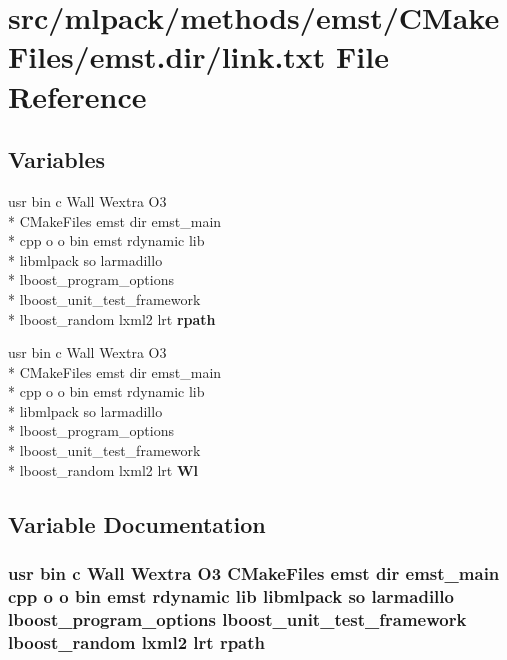 \section{src/mlpack/methods/emst/\-C\-Make\-Files/emst.dir/link.txt File Reference}
\label{methods_2emst_2CMakeFiles_2emst_8dir_2link_8txt}
\subsection*{Variables}
\begin{DoxyCompactItemize}
\item 
usr bin c Wall Wextra O3 \\*
C\-Make\-Files emst dir emst\-\_\-main \\*
cpp o o bin emst rdynamic lib \\*
libmlpack so larmadillo \\*
lboost\-\_\-program\-\_\-options \\*
lboost\-\_\-unit\-\_\-test\-\_\-framework \\*
lboost\-\_\-random lxml2 lrt {\bf rpath}
\item 
usr bin c Wall Wextra O3 \\*
C\-Make\-Files emst dir emst\-\_\-main \\*
cpp o o bin emst rdynamic lib \\*
libmlpack so larmadillo \\*
lboost\-\_\-program\-\_\-options \\*
lboost\-\_\-unit\-\_\-test\-\_\-framework \\*
lboost\-\_\-random lxml2 lrt {\bf Wl}
\end{DoxyCompactItemize}


\subsection{Variable Documentation}
\subsubsection[{rpath}]{\setlength{\rightskip}{0pt plus 5cm}usr bin c Wall Wextra O3 C\-Make\-Files emst dir emst\-\_\-main cpp o o bin emst rdynamic lib libmlpack so larmadillo lboost\-\_\-program\-\_\-options lboost\-\_\-unit\-\_\-test\-\_\-framework lboost\-\_\-random lxml2 lrt rpath}\label{methods_2emst_2CMakeFiles_2emst_8dir_2link_8txt_a8d22a1efe1c908ec46049a661ec7c572}


